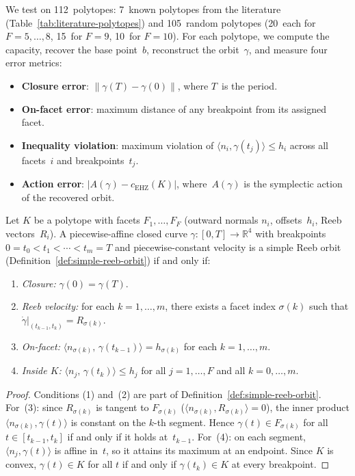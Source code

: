 We test on 112~polytopes: 7~known polytopes from the literature
(Table~\ref{tab:literature-polytopes}) and 105~random polytopes
(20~each for $F = 5, \ldots, 8$, 15~for $F = 9$, 10~for $F = 10$).
For each polytope, we compute the capacity, recover the base
point~$b$, reconstruct the orbit~$\gamma$, and measure four error
metrics:
\begin{itemize}
  \item \textbf{Closure error}: $\lVert \gamma(T) - \gamma(0) \rVert$,
    where $T$~is the period.
  \item \textbf{On-facet error}: maximum distance of any breakpoint
    from its assigned facet.
  \item \textbf{Inequality violation}: maximum violation of
    $\langle n_i, \gamma(t_j) \rangle \le h_i$ across all facets~$i$
    and breakpoints~$t_j$.
  \item \textbf{Action error}: $\lvert A(\gamma) - c_{\mathrm{EHZ}}(K) \rvert$,
    where~$A(\gamma)$ is the symplectic action of the recovered orbit.
\end{itemize}
\begin{lemma}%
\label{lem:finite-orbit-verification}
Let $K$ be a polytope with facets $F_1, \ldots, F_F$ (outward normals
$n_i$, offsets~$h_i$, Reeb vectors~$R_i$).
A piecewise-affine closed curve $\gamma \colon [0, T] \to \mathbb{R}^4$
with breakpoints $0 = t_0 < t_1 < \cdots < t_m = T$ and
piecewise-constant velocity
is a simple Reeb orbit (Definition~\ref{def:simple-reeb-orbit})
if and only if:
\begin{enumerate}
  \item \emph{Closure:}
    $\gamma(0) = \gamma(T)$.
  \item \emph{Reeb velocity:}
    for each $k = 1, \ldots, m$, there exists a facet index
    $\sigma(k)$ such that
    $\dot{\gamma}|_{(t_{k-1}, t_k)} = R_{\sigma(k)}$.
  \item \emph{On-facet:}
    $\langle n_{\sigma(k)},\, \gamma(t_{k-1}) \rangle = h_{\sigma(k)}$
    for each $k = 1, \ldots, m$.
  \item \emph{Inside $K$:}
    $\langle n_j,\, \gamma(t_k) \rangle \le h_j$
    for all $j = 1, \ldots, F$ and all $k = 0, \ldots, m$.
\end{enumerate}
\end{lemma}

\begin{proof}
Conditions (1) and~(2) are part of
Definition~\ref{def:simple-reeb-orbit}.
For~(3): since $R_{\sigma(k)}$ is tangent to $F_{\sigma(k)}$
($\langle n_{\sigma(k)}, R_{\sigma(k)} \rangle = 0$),
the inner product
$\langle n_{\sigma(k)}, \gamma(t) \rangle$ is constant on the $k$-th
segment. Hence $\gamma(t) \in F_{\sigma(k)}$ for all
$t \in [t_{k-1}, t_k]$ if and only if it holds at~$t_{k-1}$.
For~(4): on each segment, $\langle n_j, \gamma(t) \rangle$ is
affine in~$t$, so it attains its maximum at an endpoint. Since $K$ is
convex, $\gamma(t) \in K$ for all $t$ if and only if
$\gamma(t_k) \in K$ at every breakpoint.
\end{proof}

